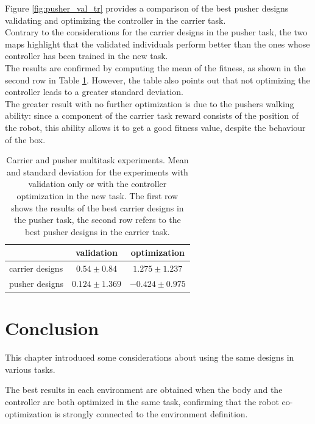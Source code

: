 Figure \ref{fig:pusher_val_tr} provides a comparison of the best pusher designs validating and optimizing the controller in the carrier task.\\
Contrary to the considerations for the carrier designs in the pusher task, the two maps highlight that the validated individuals perform better than the ones whose controller has been trained in the new task.\\
The results are confirmed by computing the mean of the fitness, as shown in the second row in Table \ref{tab:carrier_pusher_results}. However, the table also points out that not optimizing the controller leads to a greater standard deviation.\\
The greater result with no further optimization is due to the pushers walking ability: since a component of the carrier task reward consists of the position of the robot, this ability allows it to get a good fitness value, despite the behaviour of the box.
 
\begin{table}[H]
    \centering
    \begin{tabular}{|l|c|c|}
    \cline{2-3}
    \multicolumn{1}{c|}{} & \multicolumn{1}{c|}{validation} & \multicolumn{1}{c|}{optimization}\\
    \hline
        carrier designs & $ 0.54 \pm 0.84 $ & $ 1.275 \pm 1.237 $ \\
        \hline
        pusher designs & $ 0.124 \pm 1.369 $ & $ -0.424 \pm 0.975 $ \\
    \hline
    \end{tabular}
    \caption{Carrier and pusher multitask experiments.
    Mean and standard deviation for the experiments with validation only or with the controller optimization in the new task.
    The first row shows the results of the best carrier designs in the pusher task, the second row refers to the best pusher designs in the carrier task.}
    \label{tab:carrier_pusher_results}
\end{table}


\section{Conclusion}
This chapter introduced some considerations about using the same designs in various tasks.

The best results in each environment are obtained when the body and the controller are both optimized in the same task, confirming that the robot co-optimization is strongly connected to the environment definition.

